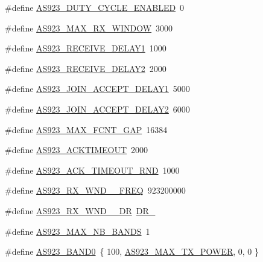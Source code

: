 \begin{DoxyCompactItemize}
\item 
\#define \hyperlink{group__REGIONAS923_ga9a38122696d349e600de24f267340b93}{A\+S923\+\_\+\+D\+U\+T\+Y\+\_\+\+C\+Y\+C\+L\+E\+\_\+\+E\+N\+A\+B\+L\+ED}~0
\item 
\#define \hyperlink{group__REGIONAS923_ga1da68477a3fef68cc666a41fb5362bc6}{A\+S923\+\_\+\+M\+A\+X\+\_\+\+R\+X\+\_\+\+W\+I\+N\+D\+OW}~3000
\item 
\#define \hyperlink{group__REGIONAS923_gaa18d3ea411b8511078af8c0a07304999}{A\+S923\+\_\+\+R\+E\+C\+E\+I\+V\+E\+\_\+\+D\+E\+L\+A\+Y1}~1000
\item 
\#define \hyperlink{group__REGIONAS923_ga37f081e957cc36c733b5008aa46b9511}{A\+S923\+\_\+\+R\+E\+C\+E\+I\+V\+E\+\_\+\+D\+E\+L\+A\+Y2}~2000
\item 
\#define \hyperlink{group__REGIONAS923_gaa108eaacc8ee4c9a46b37327b3b2eea1}{A\+S923\+\_\+\+J\+O\+I\+N\+\_\+\+A\+C\+C\+E\+P\+T\+\_\+\+D\+E\+L\+A\+Y1}~5000
\item 
\#define \hyperlink{group__REGIONAS923_gafd48180d34e9cb94a0747ea0a2dfff28}{A\+S923\+\_\+\+J\+O\+I\+N\+\_\+\+A\+C\+C\+E\+P\+T\+\_\+\+D\+E\+L\+A\+Y2}~6000
\item 
\#define \hyperlink{group__REGIONAS923_ga996b3bad607207a4c54e5a2b253e5dfd}{A\+S923\+\_\+\+M\+A\+X\+\_\+\+F\+C\+N\+T\+\_\+\+G\+AP}~16384
\item 
\#define \hyperlink{group__REGIONAS923_gad4cd8450319521a6db078659d7ee9f62}{A\+S923\+\_\+\+A\+C\+K\+T\+I\+M\+E\+O\+UT}~2000
\item 
\#define \hyperlink{group__REGIONAS923_gae069e1d35da1a7303a5242bbada80740}{A\+S923\+\_\+\+A\+C\+K\+\_\+\+T\+I\+M\+E\+O\+U\+T\+\_\+\+R\+ND}~1000
\item 
\#define \hyperlink{group__REGIONAS923_ga537225e8ec04b97e81b2434ed4015abc}{A\+S923\+\_\+\+R\+X\+\_\+\+W\+N\+D\+\_\+\_\+\+F\+R\+EQ}~923200000
\item 
\#define \hyperlink{group__REGIONAS923_gab765338caef1a1babc2572d1ced03470}{A\+S923\+\_\+\+R\+X\+\_\+\+W\+N\+D\+\_\+\_\+\+DR}~\hyperlink{group__REGION_gad402daa928a8b3dea829315fab69de17}{D\+R\+\_}
\item 
\#define \hyperlink{group__REGIONAS923_ga462d2371d2b936331d37530925ffb66d}{A\+S923\+\_\+\+M\+A\+X\+\_\+\+N\+B\+\_\+\+B\+A\+N\+DS}~1
\item 
\#define \hyperlink{group__REGIONAS923_ga78d5e5197f4e58d1e45290a300e86a2b}{A\+S923\+\_\+\+B\+A\+N\+D0}~\{ 100, \hyperlink{group__REGIONAS923_ga572944e6a8933722a954e4cee98fa0ee}{A\+S923\+\_\+\+M\+A\+X\+\_\+\+T\+X\+\_\+\+P\+O\+W\+ER}, 0,  0 \}

\end{DoxyCompactItemize}
